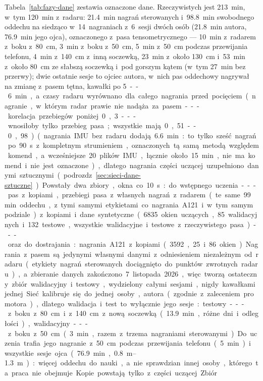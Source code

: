 \documentclass[12pt,a4paper,oneside]{report}
\begin{document}
Tabela~\ref{tab:fazy-dane} zestawia oznaczone dane. Rzeczywistych jest
\SI{213}{min}, w~tym \SI{120}{min} z~radaru: \SI{21.4}{min} nagrań sterowanych
i~\SI{98.8}{min} swobodnego oddechu na siedząco w~14~nagraniach z~6~sesji dwóch osób
(\SI{21.8}{min} autora, \SI{76.9}{min} jego ojca), oznaczonego z~pasa
tensometrycznego --- \SI{10}{min} z~radarem z~boku z~\SI{80}{cm},
\SI{3}{min} z~boku z~\SI{50}{cm}, \SI{5}{min} z~\SI{50}{cm} podczas
przewijania telefonu, \SI{4}{min} z~\SI{140}{cm} z~inną soczewką,
\SI{23}{min} z~około \SI{130}{cm} i~\SI{53}{min} z~około \SI{80}{cm} ze słabszą soczewką i~pod
gorszym kątem (w~tym \SI{27}{min} bez przerwy); dwie ostatnie sesje to ojciec autora, w~nich pas oddechowy
nagrywał na zmianę z~pasem tętna, kawałki po \SI{5}--\SI{6}{min}, a~czasy radaru
wyrównano dla całego nagrania przed pocięciem (nagranie, w~którym radar prawie nie nadąża za pasem --- korelacja przebiegów
poniżej 0,3 --- wnosiłoby tylko przebieg pasa; wszystkie mają 0,51--0,98) (nagrania IMU bez radaru
dodają \SI{6.6}{min}: to tylko sześć nagrań po \SI{90}{s} z~kompletnym
strumieniem, oznaczonych tą samą metodą względem komend, a~wcześniejsze 20~plików
IMU, łącznie około \SI{15}{min}, nie ma komend i~nie jest oznaczone), dlatego nagrania części
uczącej uzupełniono danymi sztucznymi (podrozdz.~\ref{sec:sieci-dane-sztuczne}).
Powstały dwa zbiory, okna co \SI{10}{s}: do wstępnego uczenia --- pas
z~kopiami, przebiegi pasa z~własnych nagrań z~radarem (te same
\SI{99}{min} oddechu, z~tymi samymi etykietami co nagrania A121 i~w~tym samym
podziale) z~kopiami i~dane syntetyczne (6835~okien uczących,
85~walidacyjnych i~132~testowe, wszystkie walidacyjne i~testowe z~rzeczywistego
pasa) --- oraz do dostrajania:
nagrania A121 z~kopiami (3592, 25 i~86~okien). Nagrania z~pasem są jedynymi
własnymi danymi z~odniesieniem niezależnym od radaru (etykiety nagrań sterowanych
dociągnięto do punktów zwrotnych radaru), a~zbieranie danych zakończono 7~listopada 2026,
więc tworzą ostateczny zbiór walidacyjny i~testowy, wydzielony całymi sesjami, nigdy
kawałkami jednej. Sieć kalibruje się do jednej osoby, autora (zgodnie z~zaleceniem promotora),
dlatego walidacja i~test to wyłącznie jego sesje: testowy --- z~boku z~\SI{80}{cm}
i~z~\SI{140}{cm} z~nową soczewką (\SI{13.9}{min}, różne dni i~odległości), walidacyjny ---
z~boku z~\SI{50}{cm} (\SI{3}{min}, razem z~trzema nagraniami sterowanymi). Do uczenia
trafia jego nagranie z~\SI{50}{cm} podczas przewijania telefonu (\SI{5}{min}) i~wszystkie
sesje ojca (\SI{76.9}{min}, \SIrange{0.8}{1.3}{m}): więcej oddechu do nauki, a~nie sprawdzian
innej osoby, którego ta praca nie obejmuje. Kopie powstają tylko z~części uczącej. Zbiór
\end{document}
